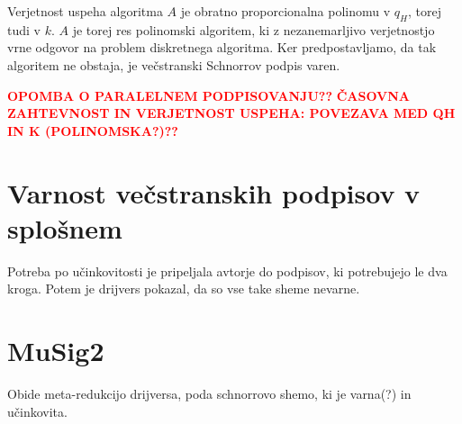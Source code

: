 \documentclass[isrm2, tisk]{fmfdelo}
\newcommand{\todo}[1]{\textcolor{red}{\textbf{\uppercase{#1}??}}}
\begin{document}
Verjetnost uspeha algoritma $A$ je obratno proporcionalna polinomu v $q_H$, torej tudi v $k$. $A$ 
je torej res polinomski algoritem, ki z nezanemarljivo verjetnostjo vrne odgovor na problem diskretnega
algoritma. Ker predpostavljamo, da tak algoritem ne obstaja, je večstranski Schnorrov podpis varen.

\todo{opomba o paralelnem podpisovanju}
\todo{časovna zahtevnost in verjetnost uspeha: povezava med qH in k (polinomska?)}

\section{Varnost večstranskih podpisov v splošnem}
\label{sec:varnost}
Potreba po učinkovitosti je pripeljala avtorje do podpisov, ki potrebujejo le dva kroga. Potem je 
drijvers pokazal, da so vse take sheme nevarne.

\section{MuSig2}
\label{sec:musig2}
Obide meta-redukcijo drijversa, poda schnorrovo shemo, ki je varna(?) in učinkovita.
\end{document}
